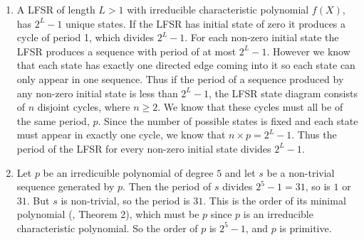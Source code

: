 \begin{enumerate}

\item A LFSR of length $L > 1$ with irreducible characteristic polynomial $f(X)$,
has $2^{L}-1$ unique states. If the LFSR has initial state of zero it produces a
cycle of period 1, which divides $2^{L}-1$. For each non-zero initial state the LFSR produces a sequence with period of at most $2^{L}-1$. However we know that each state has exactly one directed edge coming into it so 
each state can only appear in one sequence. Thus if the period of a sequence produced
by any non-zero initial state is less than $2^{L}-1$, the LFSR state diagram 
consists of $n$ disjoint cycles, where $n \geq 2$. We know that these cycles 
must all be of the same period, $p$. Since the number of possible states is fixed 
and each state must appear in exactly one cycle, we know that $n \times p = 2^{L}-1$.
Thus the period of the LFSR for every non-zero initial state divides $2^{L}-1$.

\item Let $p$ be an irredicuible polynomial of degree $5$ and let $s$ be a non-trivial
sequence generated by $p$. Then the period of $s$ divides $2^5-1=31$, so is $1$ or $31$.
But $s$ is non-trivial, so the period is $31$. This is the order of its minimal polynomial
(\cite{slides}, Theorem 2), which must be $p$ since $p$ is an irreducible characteristic
polynomial. So the order of $p$ is $2^5-1$, and $p$ is primitive.

\end{enumerate}
